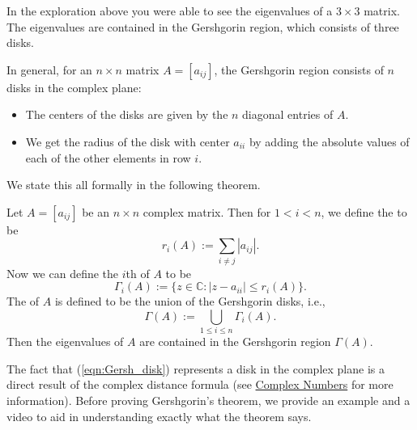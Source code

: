 \documentclass{ximera}
\begin{document}
In the exploration above you were able to see the eigenvalues of a $3 \times 3$ matrix.  The eigenvalues are contained in the Gershgorin region, which consists of three disks.  

In general, for an $n \times n$ matrix $A=[a_{ij}]$, the Gershgorin region consists of $n$ disks in the complex plane:  
\begin{itemize}
\item
The centers of the disks are given by the $n$ diagonal entries of $A$.  
\item
We get the radius of the disk with center $a_{ii}$ by adding the absolute values of each of the other elements in row $i$.  
\end{itemize}
We state this all formally in the following theorem.


\begin{theorem}[Gershgorin]\label{th:Gershgorin}
Let $A=[a_{ij}]$ be an $n\times n$ complex matrix.  Then for $1<i<n$, we define the  to be
$$
r_i(A):= \sum_{i \ne j} |a_{ij}|.
$$
Now we can define the $i$th  of $A$ to be
\begin{equation}\label{eqn:Gersh_disk}
\Gamma_i(A) := \{ z \in \mathbb{C} : |z-a_{ii}| \le r_i(A) \}.
\end{equation}
 The  of $A$ is defined to be the union of the Gershgorin disks, i.e.,
$$
\Gamma(A) := \bigcup_{1 \le i \le n} \Gamma_i(A).
$$
Then the eigenvalues of $A$ are contained in the Gershgorin region $\Gamma(A)$.
\end{theorem}

The fact that (\ref{eqn:Gersh_disk}) represents a disk in the complex plane is a direct result of the complex distance formula  (see \href{https://ximera.osu.edu/oerlinalg/LinearAlgebra/APX-0020/main}{Complex Numbers} for more information). Before proving Gershgorin's theorem, we provide an example and a video to aid in understanding exactly what the theorem says.

\end{document}
